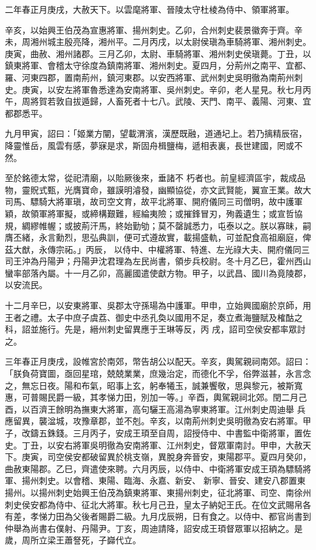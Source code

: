 \begin{pinyinscope}
 二年春正月庚戌，大赦天下。以雲麾將軍、晉陵太守杜棱為侍中、領軍將軍。



 辛亥，以始興王伯茂為宣惠將軍、揚州刺史。乙卯，合州刺史裴景徽奔于齊。辛未，周湘州城主殷亮降，湘州平。二月丙戌，以太尉侯瑱為車騎將軍、湘州刺史。庚寅，曲赦、湘州諸郡。三月乙卯，太尉、車騎將軍、湘州刺史侯瑱薨。丁丑，以鎮東將軍、會稽太守徐度為鎮南將軍、湘州刺史。夏四月，分荊州之南平、宜都、
 羅、河東四郡，置南荊州，鎮河東郡。以安西將軍、武州刺史吳明徹為南荊州刺史。庚寅，以安左將軍魯悉達為安南將軍、吳州刺史。辛卯，老人星見。秋七月丙午，周將賀若敦自拔遁歸，人畜死者十七八。武陵、天門、南平、義陽、河東、宜都郡悉平。



 九月甲寅，詔曰：「姬業方闡，望載渭濱，漢歷既融，道通圮上。若乃摛精辰宿，降靈惟岳，風雲有感，夢寐是求，斯固舟楫鹽梅，遞相表裏，長世建國，罔或不然。



 至於銘德太常，從祀清廟，以貽厥後來，垂諸不
 朽者也。前皇經濟區宇，裁成品物，靈貺式甄，光膺寶命，雖謨明濬發，幽顯協從，亦文武賢能，翼宣王業。故大司馬、驃騎大將軍瑱，故司空文育，故平北將軍、開府儀同三司僧明，故中護軍穎，故領軍將軍擬，或締構艱難，經綸夷險；或摧鋒冒刃，殉義遺生；或宣哲協規，綢繆帷幄；或披荊汗馬，終始勤劬；莫不罄誠悉力，屯泰以之。朕以寡昧，嗣膺丕緒，永言勳烈，思弘典訓，便可式遵故實，載揚盛軌，可並配食高祖廟庭，俾茲大猷，永傳宗祏。」丙辰，
 以侍中、中權將軍、特進、左光祿大夫、開府儀同三司王沖為丹陽尹；丹陽尹沈君理為左民尚書，領步兵校尉。冬十月乙巳，霍州西山蠻率部落內屬。十一月乙卯，高麗國遣使獻方物。甲子，以武昌、國川為竟陵郡，以安流民。



 十二月辛巳，以安東將軍、吳郡太守孫瑒為中護軍。甲申，立始興國廟於京師，用王者之禮。太子中庶子虞荔、御史中丞孔奐以國用不足，奏立煮海鹽賦及榷酤之科，詔並施行。先是，縉州刺史留異應于王琳等反，丙
 戌，詔司空侯安都率眾討之。



 三年春正月庚戌，設帷宮於南郊，幣告胡公以配天。辛亥，輿駕親祠南郊。詔曰：「朕負荷寶圖，亟回星琯，兢兢業業，庶幾治定，而德化不孚，俗弊滋甚，永言念之，無忘日夜。陽和布氣，昭事上玄，躬奉犧玉，誠兼饗敬，思與黎元，被斯寬惠，可普賜民爵一級，其孝悌力田，別加一等。」辛酉，輿駕親祠北郊。閏二月己酉，以百濟王餘明為撫東大將軍，高句驪王高湯為寧東將軍。江州刺史周迪舉
 兵應留異，襲湓城，攻豫章郡，並不剋。辛亥，以南荊州刺史吳明徹為安右將軍。甲子，改鑄五銖錢。三月丙子，安成王頊至自周，詔授侍中、中書監中衛將軍，置佐史。丁丑，以安右將軍吳明徹為安南將軍、江州刺史，督眾軍南討。甲申，大赦天下。庚寅，司空侯安都破留異於桃支嶺，異脫身奔晉安，東陽郡平。夏四月癸卯，曲赦東陽郡。乙巳，齊遣使來聘。六月丙辰，以侍中、中衛將軍安成王頊為驃騎將軍、揚州刺史。以會稽、東陽、臨海、永嘉、新安、
 新寧、晉安、建安八郡置東揚州。以揚州刺史始興王伯茂為鎮東將軍、東揚州刺史，征北將軍、司空、南徐州刺史侯安都為侍中、征北大將軍。秋七月己丑，皇太子納妃王氏。在位文武賜帛各有差，孝悌力田為父後者賜爵二級。九月戊辰朔，日有食之。以侍中、都官尚書到仲舉為尚書右僕射、丹陽尹。丁亥，周迪請降，詔安成王頊督眾軍以招納之。是歲，周所立梁王蕭詧死，子巋代立。




\end{pinyinscope}
